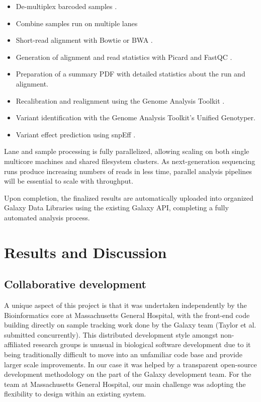 \documentclass[10pt]{bmc_article}
\newenvironment{bmcformat}{\begin{raggedright}\baselineskip20pt\sloppy\setboolean{publ}{false}}{\end{raggedright}\baselineskip20pt\sloppy}
\begin{document}
\begin{bmcformat}
\begin{itemize}
  \item De-multiplex barcoded samples \cite{cock_biopython:_2009}.
  \item Combine samples run on multiple lanes
  \item Short-read alignment with Bowtie or BWA
    \cite{langmead_ultrafast_2009,li_fast_2009}.
  \item Generation of alignment and read statistics with Picard and
    FastQC \cite{_picard_????,fastqc}.
  \item Preparation of a summary PDF with detailed statistics
    about the run and alignment.
  \item Recalibration and realignment using the Genome Analysis
    Toolkit
    \cite{mckenna_genome_2010,_pysam_????,gautier_intuitive_2010}.
  \item Variant identification with the Genome Analysis Toolkit's
    Unified Genotyper.
  \item Variant effect prediction using snpEff \cite{_snpeff_????}.
\end{itemize}

Lane and sample processing is fully parallelized, allowing scaling on
both single multicore machines and shared filesystem clusters. As
next-generation sequencing runs produce increasing numbers of reads in
less time, parallel analysis pipelines will be essential to scale with
throughput.

Upon completion, the finalized results are
automatically uploaded into organized Galaxy Data Libraries using the
existing Galaxy API, completing a fully automated analysis process.

\section*{Results and Discussion}

\subsection*{Collaborative development}

A unique aspect of this project is that it was undertaken
independently by the Bioinformatics core at Massachusetts General
Hospital, with the front-end code building directly on sample tracking
work done by the Galaxy team (Taylor et al. submitted concurrently).
This distributed development style
amongst non-affiliated research groups is unusual in biological software
development due to it being traditionally difficult to move into an
unfamiliar code base and provide larger scale improvements. In our
case it was helped by a transparent open-source development
methodology on the part of the Galaxy development team. For the team
at Massachusetts General Hospital, our main challenge was adopting
the flexibility to design within an existing system.


\end{bmcformat}
\end{document}
